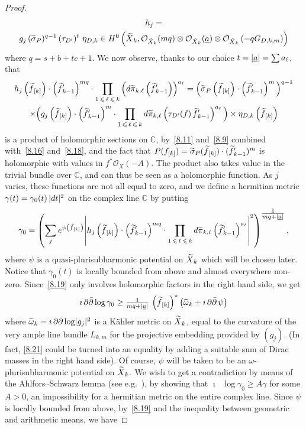 \documentclass[AHL,Unicode,longabstracts,published]{cedram}
\DeclareMathOperator{\ddbar}{\partial\bar\partial}
\DeclarePairedDelimiter{\abs}{\lvert}{\rvert}
\newcommand*\cO{\mathcal{O}}
\newcommand*\bC{\mathbb{C}}
\let\leq\leqslant
\let\geq\geqslant
\let\oldtilde\tilde
\renewcommand*{\tilde}[1]{\mathchoice{\widetilde{#1}}{\widetilde{#1}}{\oldtilde{#1}}{\oldtilde{#1}}}
\begin{document}
\begin{proof}
\begin{multline}\label{8.18}
h_j=\\
g_j\,(\tilde\sigma_P)^{q-1}\,(\tau_{D'})^t~\eta_{D,k}
\in H^0\left(\tilde X_k,
\cO_{\tilde X_k}(mq)\otimes\cO_{\tilde X_k}(\underline a)\otimes
\cO_{\tilde X_k}\left(-qG_{D,k,m}\right)\right)
\end{multline}
where $q=s+b+tc+1$. We now observe, thanks to our choice $t=\abs{\underline a}=\sum a_\ell$, that
\begin{multline}\label{8.19}
h_j\left(\tilde f_{[k]}\right)\cdot \left(\tilde f'_{k-1}\right)^{mq}\cdot \prod_{1\,\leq\,\ell\,\leq\,k} \left(d\tilde\pi_{k,\ell}\left(\tilde f'_{k-1}\right)\right)^{a_\ell}
=\Big(\tilde\sigma_P\left(\tilde f_{[k]}\right)\cdot \left(\tilde f'_{k-1}\right)^m\Big)^{q-1}
\\
\times\Big(g_j\left(\tilde f_{[k]}\right)\cdot \left(\tilde f'_{k-1}\right)^m\cdot
\prod_{1\,\leq\,\ell\,\leq\,k}d\tilde\pi_{k,\ell}\left(\tau_{D'}(f)\,\tilde f'_{k-1}\right)^{a_\ell}\Big)
\times \eta_{D,k}\left(\tilde f_{[k]}\right)
\end{multline}
is a product of holomorphic sections on $\bC$, by~\eqref{8.11} and~\eqref{8.9} combined with~\eqref{8.16} and~\eqref{8.18}, and the fact that $P(f_{[k]})=\tilde\sigma_P(\tilde f_{[k]})\cdot (\tilde f'_{k-1})^m$ is holomorphic with values in $f^*\cO_X(-A)$. The product also takes value in the trivial bundle over $\bC$, and can thus be seen as a holomorphic function. As $j$ varies, these functions are not all equal to zero, and we define a hermitian metric $\gamma(t)=\gamma_0(t)\,\abs{dt}^2$ on the complex line $\bC$ by putting
\[
\gamma_0 =
\left(
\sum_je^{\psi\left(\tilde f_{[k]}\right)}
\abs*{h_j\left(\tilde f_{[k]}\right)\cdot\left(\tilde f'_{k-1}\right)^{mq}
\cdot
\prod_{1\,\leq\,\ell\,\leq\,k} d\tilde\pi_{k,\ell}\left(\tilde f'_{k-1}\right)^{a_\ell} }^2
\right)^{\tfrac{1}{mq+\abs{\underline a}}},
\]
where $\psi$ is a quasi-plurisubharmonic potential on $\tilde X_k$ which will be chosen later. Notice that $\gamma_0(t)$ is locally bounded from above and almost everywhere non-zero. Since~\eqref{8.19} only involves holomorphic factors in the right hand side, we get
\begin{equation}\label{8.21}
\imath\ddbar\log\gamma_0\ge
\tfrac{1}{ mq+\abs{\underline a}}\,\left(\tilde f_{[k]}\right)^*\left(\tilde\omega_k+\imath\ddbar\psi\right)
\end{equation}
where $\tilde\omega_k=\imath\ddbar\log\abs{g_j}^2$ is a K\"ahler metric on $\tilde X_k$, equal to the curvature of the very ample line bundle $L_{k,m}$ for the projective embedding provided by $(g_j)$. (In fact, \eqref{8.21} could be turned into an equality by adding a suitable sum of Dirac masses in the right hand side). Of course, $\psi$ will be taken to be an $\omega$-plurisubharmonic potential on $\tilde X_k$. We wish to get a contradiction by means of the Ahlfors--Schwarz lemma (see e.g.~\cite[Lemma~3.2]{Dem97}), by showing that $\imath\ddbar\log\gamma_0\geq A\gamma$ for some $A>0$, an impossibility for a hermitian metric on the entire complex line. Since $\psi$ is locally bounded from above, by~\eqref{8.19} and the inequality between geometric and arithmetic means, we have

\end{proof}
\end{document}
